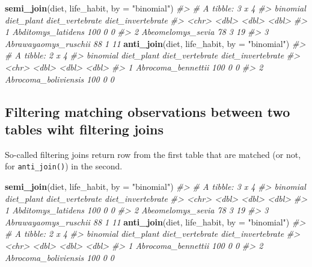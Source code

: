 \documentclass[]{book}
\newenvironment{Shaded}{}{}
\newcommand{\CommentTok}[1]{\textcolor[rgb]{0.38,0.63,0.69}{\textit{#1}}}
\newcommand{\DataTypeTok}[1]{\textcolor[rgb]{0.56,0.13,0.00}{#1}}
\newcommand{\KeywordTok}[1]{\textcolor[rgb]{0.00,0.44,0.13}{\textbf{#1}}}
\newcommand{\NormalTok}[1]{#1}
\newcommand{\StringTok}[1]{\textcolor[rgb]{0.25,0.44,0.63}{#1}}
\begin{document}
\begin{Shaded}
\begin{Highlighting}[]
\KeywordTok{semi_join}\NormalTok{(diet, life_habit, }\DataTypeTok{by  =} \StringTok{"binomial"}\NormalTok{)}
\CommentTok{#> # A tibble: 3 x 4}
\CommentTok{#>   binomial             diet_plant diet_vertebrate diet_invertebrate}
\CommentTok{#>   <chr>                     <dbl>           <dbl>             <dbl>}
\CommentTok{#> 1 Abditomys_latidens          100               0                 0}
\CommentTok{#> 2 Abeomelomys_sevia            78               3                19}
\CommentTok{#> 3 Abrawayaomys_ruschii         88               1                11}
\KeywordTok{anti_join}\NormalTok{(diet, life_habit, }\DataTypeTok{by  =} \StringTok{"binomial"}\NormalTok{)}
\CommentTok{#> # A tibble: 2 x 4}
\CommentTok{#>   binomial             diet_plant diet_vertebrate diet_invertebrate}
\CommentTok{#>   <chr>                     <dbl>           <dbl>             <dbl>}
\CommentTok{#> 1 Abrocoma_bennettii          100               0                 0}
\CommentTok{#> 2 Abrocoma_boliviensis        100               0                 0}
\end{Highlighting}
\end{Shaded}

\hypertarget{filtering-matching-observations-between-two-tables-wiht-filtering-joins}{%
\subsection{Filtering matching observations between two tables wiht filtering joins}\label{filtering-matching-observations-between-two-tables-wiht-filtering-joins}}

So-called filtering joins return row from the first table that are matched
(or not, for \texttt{anti\_join()}) in the second.

\begin{Shaded}
\begin{Highlighting}[]
\KeywordTok{semi_join}\NormalTok{(diet, life_habit, }\DataTypeTok{by  =} \StringTok{"binomial"}\NormalTok{)}
\CommentTok{#> # A tibble: 3 x 4}
\CommentTok{#>   binomial             diet_plant diet_vertebrate diet_invertebrate}
\CommentTok{#>   <chr>                     <dbl>           <dbl>             <dbl>}
\CommentTok{#> 1 Abditomys_latidens          100               0                 0}
\CommentTok{#> 2 Abeomelomys_sevia            78               3                19}
\CommentTok{#> 3 Abrawayaomys_ruschii         88               1                11}
\KeywordTok{anti_join}\NormalTok{(diet, life_habit, }\DataTypeTok{by  =} \StringTok{"binomial"}\NormalTok{)}
\CommentTok{#> # A tibble: 2 x 4}
\CommentTok{#>   binomial             diet_plant diet_vertebrate diet_invertebrate}
\CommentTok{#>   <chr>                     <dbl>           <dbl>             <dbl>}
\CommentTok{#> 1 Abrocoma_bennettii          100               0                 0}
\CommentTok{#> 2 Abrocoma_boliviensis        100               0                 0}
\end{Highlighting}
\end{Shaded}
\end{document}

